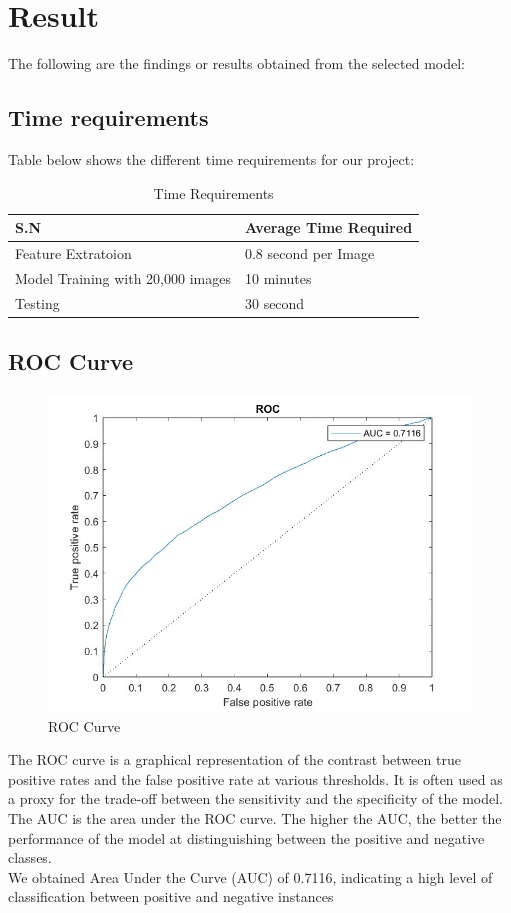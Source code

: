 \section{Result}
The following are the findings or results obtained from the selected model:
\subsection{Time requirements}
Table below shows the different time requirements for our project:
\begin{table}[H]
    \centering
    \begin{tabular}{|l|l|}
    \hline
    S.N                & Average Time Required \\ \hline
    Feature Extratoion & 0.8 second per Image            \\ \hline
    Model Training with 20,000 images  & 10 minutes            \\ \hline
    Testing            & 30 second             \\ \hline
    \end{tabular}
    \caption{Time Requirements}
    \end{table}
\subsection{ROC Curve}
\begin{figure}[H]
    \centering
    \includegraphics[width=120mm]{./img/2600/roc2600.jpg}
    \caption{ROC Curve}
\end{figure}
The ROC curve is a graphical representation of the contrast between true positive rates and the false positive rate at various thresholds. It is often used as a proxy for the trade-off between the sensitivity and the specificity of the model. The AUC is the area under the ROC curve. The higher the AUC, the better the performance of the model at distinguishing between the positive and negative classes.\\
We obtained Area Under the Curve (AUC) of 0.7116, indicating a high level of classification between positive and negative instances
